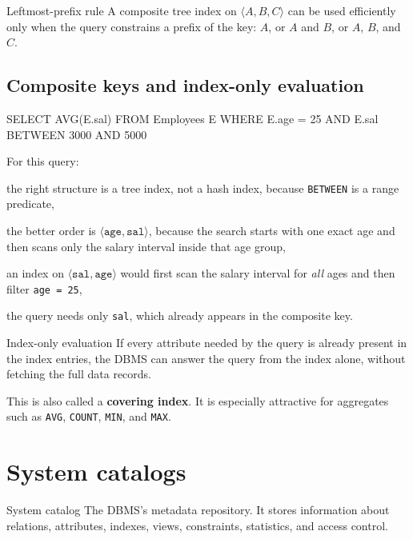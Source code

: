 \documentclass[../../dis.tex]{subfiles}
\begin{document}
\begin{concept}{Leftmost-prefix rule}
A composite tree index on $\langle A, B, C \rangle$ can be used efficiently only when the query constrains a prefix of the key: $A$, or $A$ and $B$, or $A$, $B$, and $C$.
\end{concept}

\subsection{Composite keys and index-only evaluation}
\begin{sql}
SELECT AVG(E.sal)
FROM Employees E
WHERE E.age = 25
  AND E.sal BETWEEN 3000 AND 5000
\end{sql}

For this query:
\begin{dashlist}
    \item the right structure is a tree index, not a hash index, because \texttt{BETWEEN} is a range predicate,
    \item the better order is $\langle \texttt{age}, \texttt{sal} \rangle$, because the search starts with one exact age and then scans only the salary interval inside that age group,
    \item an index on $\langle \texttt{sal}, \texttt{age} \rangle$ would first scan the salary interval for \emph{all} ages and then filter \texttt{age = 25},
    \item the query needs only \texttt{sal}, which already appears in the composite key.
\end{dashlist}

\begin{concept}{Index-only evaluation}
If every attribute needed by the query is already present in the index entries, the DBMS can answer the query from the index alone, without fetching the full data records.
\end{concept}

This is also called a \textbf{covering index}. It is especially attractive for aggregates such as \texttt{AVG}, \texttt{COUNT}, \texttt{MIN}, and \texttt{MAX}.

\section{System catalogs}
\begin{concept}{System catalog}
The DBMS's metadata repository. It stores information about relations, attributes, indexes, views, constraints, statistics, and access control.
\end{concept}
\end{document}
